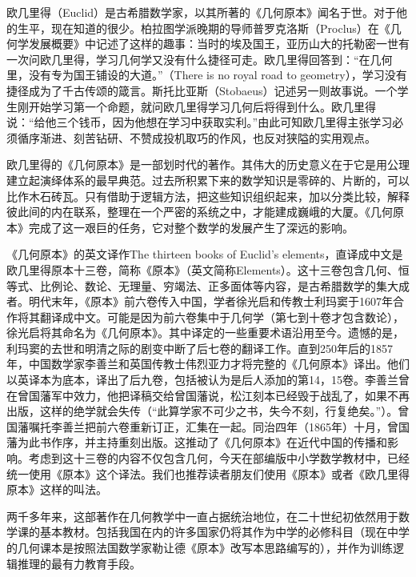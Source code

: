 \documentclass[b5paper]{ctexart}
\begin{document}
\begin{mdframed}

 
欧几里得（Euclid）是古希腊数学家，以其所著的《几何原本》闻名于世。对于他的生平，现在知道的很少。柏拉图学派晚期的导师普罗克洛斯（Proclus）在《几何学发展概要》中记述了这样的趣事：当时的埃及国王，亚历山大的托勒密一世有一次问欧几里得，学习几何学又没有什么捷径可走。欧几里得回答到：“在几何里，没有专为国王铺设的大道。\footnotemark”（There is no royal road to geometry），学习没有捷径成为了千古传颂的箴言。斯托比亚斯（Stobaeus）记述另一则故事说。一个学生刚开始学习第一个命题，就问欧几里得学习几何后将得到什么。欧几里得说：“给他三个钱币，因为他想在学习中获取实利。”由此可知欧几里得主张学习必须循序渐进、刻苦钻研、不赞成投机取巧的作风，也反对狭隘的实用观点\cite{Elements}。

欧几里得的《几何原本》是一部划时代的著作。其伟大的历史意义在于它是用公理建立起演绎体系的最早典范。过去所积累下来的数学知识是零碎的、片断的，可以比作木石砖瓦。只有借助于逻辑方法，把这些知识组织起来，加以分类比较，解释彼此间的内在联系，整理在一个严密的系统之中，才能建成巍峨的大厦。《几何原本》完成了这一艰巨的任务，它对整个数学的发展产生了深远的影响。

 
《几何原本》的英文译作The thirteen books of Euclid's elements，直译成中文是欧几里得原本十三卷，简称《原本》（英文简称Elements）。这十三卷包含几何、恒等式、比例论、数论、无理量、穷竭法、正多面体等内容，是古希腊数学的集大成者。明代末年，《原本》前六卷传入中国，学者徐光启和传教士利玛窦于1607年合作将其翻译成中文。可能是因为前六卷集中于几何学（第七到十卷才包含数论），徐光启将其命名为《几何原本》。其中译定的一些重要术语沿用至今。遗憾的是，利玛窦的去世和明清之际的剧变中断了后七卷的翻译工作。直到250年后的1857年，中国数学家李善兰和英国传教士伟烈亚力才将完整的《几何原本》译出。他们以英译本为底本，译出了后九卷，包括被认为是后人添加的第14，15卷。李善兰曾在曾国藩军中效力，他把译稿交给曾国藩说，松江刻本已经毁于战乱了，如果不再出版，这样的绝学就会失传（“此算学家不可少之书，失今不刻，行复绝矣。”）。曾国藩嘱托李善兰把前六卷重新订正，汇集在一起。同治四年（1865年）十月，曾国藩为此书作序，并主持重刻出版。这推动了《几何原本》在近代中国的传播和影响。考虑到这十三卷的内容不仅包含几何，今天在部编版中小学数学教材中，已经统一使用《原本》这个译法。我们也推荐读者朋友们使用《原本》或者《欧几里得原本》这样的叫法。

两千多年来，这部著作在几何教学中一直占据统治地位，在二十世纪初依然用于数学课的基本教材。包括我国在内的许多国家仍将其作为中学的必修科目（现在中学的几何课本是按照法国数学家勒让德《原本》改写本思路编写的），并作为训练逻辑推理的最有力教育手段\cite{HanXueTao16}。
\end{mdframed}
\end{document}
